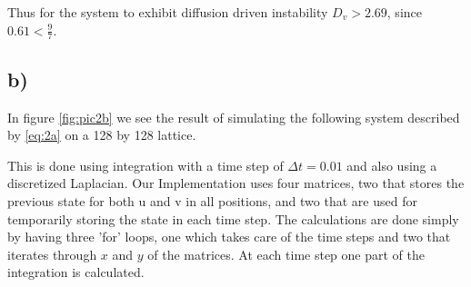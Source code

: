 Thus for the system to exhibit diffusion driven instability $D_v > 2.69$, since $0.61 < \frac{9}{7}$.


\subsection*{b)}

In figure \ref{fig:pic2b} we see the result of simulating the following system described by \eqref{eq:2a} on a 128 by 128 lattice.

This is done using integration with a time step of $\Delta t = 0.01$ and also using a discretized Laplacian. Our Implementation uses four matrices, two that stores the previous state for both u and v in all positions, and two that are used for temporarily storing the state in each time step. The calculations are done simply by having three 'for' loops, one which takes care of the time steps and two that iterates through $x$ and $y$ of the matrices. At each time step one part of the integration is calculated.

